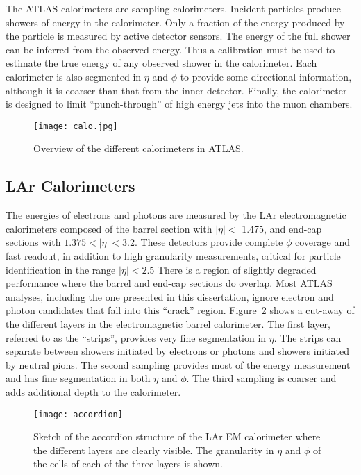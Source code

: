 The ATLAS calorimeters are sampling calorimeters. 
Incident particles produce showers of energy in the calorimeter. 
Only a fraction of the energy produced by the particle is
measured by active detector sensors. 
The energy of the full shower can be inferred from the observed
energy. Thus a calibration must be used to estimate the true energy
of any observed shower in the calorimeter. Each calorimeter is also segmented in $\eta$ and
$\phi$  to provide some directional information, although it is coarser than that from
the inner detector. Finally, the calorimeter is designed to limit ``punch-through'' of high
energy jets into the muon chambers.

\begin{figure}[htb!]
\centering
\texttt{[image: calo.jpg]}
\caption{Overview of the different calorimeters in ATLAS.}%
\label{fig:exp.atlas.calo}
\end{figure} 


\subsection*{LAr Calorimeters}

The energies of electrons and photons are measured by the LAr electromagnetic calorimeters composed of 
the barrel section with $|\eta| <$ 1.475, and end-cap sections with $1.375 < |\eta| < 3.2$.
These detectors provide complete $\phi$ coverage and fast readout, in addition to 
high granularity measurements, critical for particle identification in the range $|\eta|<2.5$
There is a region of slightly degraded performance where the barrel and end-cap sections 
do overlap. Most ATLAS analyses, including the one presented in this dissertation, ignore
electron and photon candidates that fall into this ``crack'' region.
Figure~\ref{fig:exp.atlas.accordion}
shows a cut-away of the different layers in the electromagnetic barrel calorimeter. The first layer, referred to as
the ``strips'', provides very fine segmentation in $\eta$. The strips can separate between showers initiated
by electrons or photons and showers initiated by neutral pions. The second sampling provides most
of the energy measurement and has fine segmentation in both $\eta$ and $\phi$. The third sampling is coarser
and adds additional depth to the calorimeter.



\begin{figure}[htb!]
\centering
\texttt{[image: accordion]}
\caption{Sketch of the accordion structure of the LAr EM calorimeter
where the different layers are clearly visible. 
The granularity in $\eta$ and $\phi$ of the cells of each of the three layers is shown.}%
\label{fig:exp.atlas.accordion}
\end{figure} 


